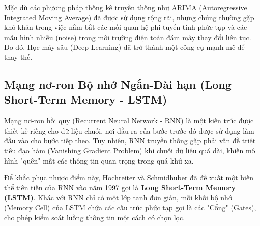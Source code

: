 Mặc dù các phương pháp thống kê truyền thống như ARIMA (Autoregressive Integrated Moving Average) đã được sử dụng rộng rãi, nhưng chúng thường gặp khó khăn trong việc nắm bắt các mối quan hệ phi tuyến tính phức tạp và các mẫu hình nhiễu (noise) trong môi trường điện toán đám mây thay đổi liên tục. Do đó, Học máy sâu (Deep Learning) đã trở thành một công cụ mạnh mẽ để thay thế.

\subsection{Mạng nơ-ron Bộ nhớ Ngắn-Dài hạn (Long Short-Term Memory - LSTM)}
Mạng nơ-ron hồi quy (Recurrent Neural Network - RNN) là một kiến trúc được thiết kế riêng cho dữ liệu chuỗi, nơi đầu ra của bước trước đó được sử dụng làm đầu vào cho bước tiếp theo. Tuy nhiên, RNN truyền thống gặp phải vấn đề triệt tiêu đạo hàm (Vanishing Gradient Problem) khi chuỗi dữ liệu quá dài, khiến mô hình "quên" mất các thông tin quan trọng trong quá khứ xa.

Để khắc phục nhược điểm này, Hochreiter và Schmidhuber đã đề xuất một biến thể tiên tiến của RNN vào năm 1997 gọi là \textbf{Long Short-Term Memory (LSTM)}. Khác với RNN chỉ có một lớp tanh đơn giản, mỗi khối bộ nhớ (Memory Cell) của LSTM chứa các cấu trúc phức tạp gọi là các "Cổng" (Gates), cho phép kiểm soát luồng thông tin một cách có chọn lọc.

